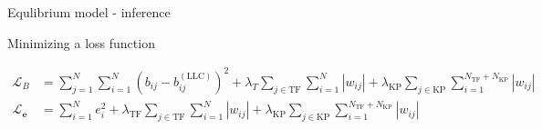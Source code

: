 \begin{frame}{Equlibrium model - inference}
\label{sec:equilibrium_inference}


Minimizing a loss function


\begin{subequations}
\label{eq:loss}
\begin{align}
\mathcal{L}_B &=
\sum_{j=1}^N \sum_{i=1}^N
\left(b_{ij} - b_{ij}^{(\text{LLC})}\right)^2
+ \lambda_T \sum_{j \in \text{TF}} \sum_{i=1}^N |w_{ij}| + \lambda_\text{KP} \sum_{j \in \text{KP}} \sum_{i=1}^{N_\text{TF} + N_\text{KP}} |w_{ij}|
\label{eq:loss_B}
\\
\mathcal{L}_{\boldsymbol{e}} &=
\sum_{i=1}^N e_i^2 + \lambda_\text{TF} \sum_{j \in \text{TF}} \sum_{i=1}^N |w_{ij}| + \lambda_\text{KP} \sum_{j \in \text{KP}} \sum_{i=1}^{N_\text{TF} + N_\text{KP}} |w_{ij}|
\label{eq:loss_e}
\end{align}
\end{subequations}



\end{frame}